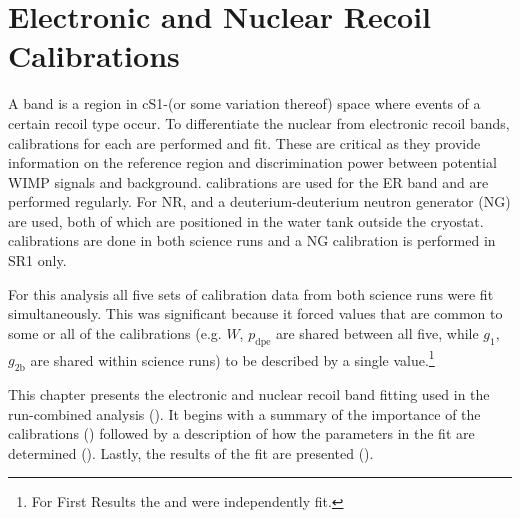 

\pagestyle{cu}
\graphicspath{{./Chapter4/Figures/}}
\chapter[Electronic and Nuclear Recoil Calibrations][Electronic and Nuclear Recoil Calibrations]{Electronic and Nuclear Recoil Calibrations}
\label{chap:er_nr_calibrations}



A band is a region in cS1-\cstwob (or some variation thereof) space where events of a certain recoil type occur.  To
differentiate the nuclear from electronic recoil bands, calibrations for each are performed and fit.  These are critical as
they provide information on the reference region and discrimination power between potential WIMP signals and background.  
calibrations are used for the ER band and are performed regularly.  For NR,  and a deuterium-deuterium
neutron generator (NG) are used, both of which are positioned in the water tank outside the cryostat.  \ambe calibrations are done in
both science runs and a NG calibration is performed in SR1 only.

For this analysis all five sets of calibration data from both science runs were fit simultaneously.  This was
significant because it forced values that are common to some or all of the calibrations (e.g. $W$, $p_{\mathrm{dpe}}$ are shared
between all five, while $g_1$, $g_{2\mathrm{b}}$ are shared within science runs) to be described by a single
value.\footnote{For First Results the \radoncal and \ambe were independently fit.}

This chapter presents the electronic and nuclear recoil band fitting used in the run-combined analysis ().  It
begins with a summary of the importance of the calibrations () followed by a description of how
the parameters in the fit are determined ().  Lastly, the results of the fit are
presented ().



